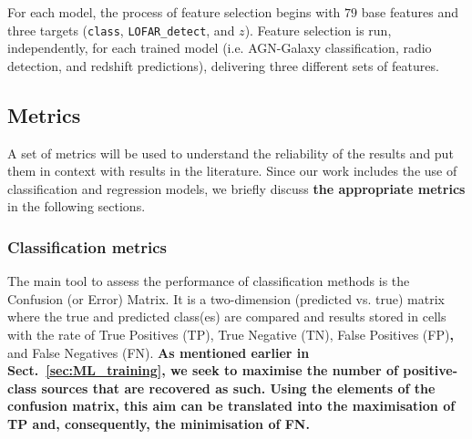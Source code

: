 \documentclass{aa}
\begin{document}

For each model, the process of feature selection begins with $79$ base features and three targets (\verb|class|, \verb|LOFAR_detect|, and $z$). Feature selection is run, independently, for each trained model (i.e. AGN-Galaxy classification, radio detection, and redshift predictions), delivering three different sets of features.

\subsection{Metrics}\label{sec:metrics}

A set of metrics will be used to understand the reliability of the results and put them in context with results in the literature. 
Since our work includes the use of classification and regression models, we briefly discuss \textbf{the appropriate metrics} in the following sections.

\subsubsection{Classification metrics}\label{sec:metrics_classfication}

The main tool to assess the performance of classification methods is the Confusion (or Error) Matrix. It is a two-dimension (predicted vs. true) matrix where the true and predicted class(es) are compared and results stored in cells with the rate of True Positives (TP), True Negative (TN), False Positives (FP)\textbf{,} and False Negatives (FN). \textbf{As mentioned earlier in Sect.~\ref{sec:ML_training}, we seek to maximise the number of positive-class sources that are recovered as such. Using the elements of the confusion matrix, this aim can be translated into the maximisation of TP and, consequently, the minimisation of FN.}
\end{document}
